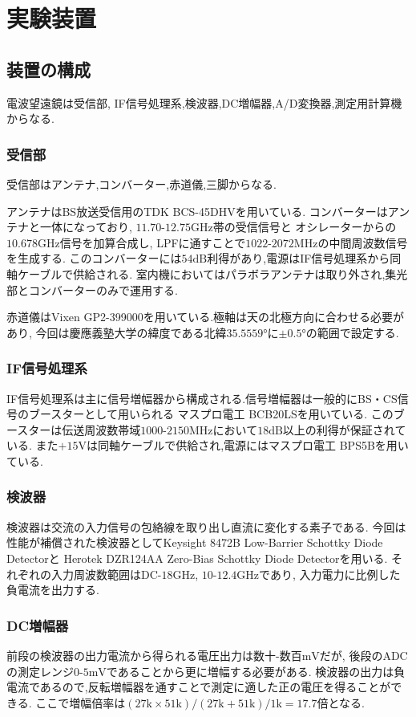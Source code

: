 \section{実験装置}
\subsection{装置の構成}
電波望遠鏡は受信部, IF信号処理系,検波器,DC増幅器,A/D変換器,測定用計算機からなる.
\subsubsection{受信部}
受信部はアンテナ,コンバーター,赤道儀,三脚からなる.

アンテナはBS放送受信用のTDK BCS-45DHVを用いている.
コンバーターはアンテナと一体になっており, $11.70$-$12.75\si{\giga\hertz}$帯の受信信号と
オシレーターからの$10.678\si{\giga\hertz}$信号を加算合成し,
LPFに通すことで$1022$-$2072\si{\mega\hertz}$の中間周波数信号を生成する.
このコンバーターには$54\si{\deci\bel}$利得があり,電源はIF信号処理系から同軸ケーブルで供給される.
室内機においてはパラボラアンテナは取り外され,集光部とコンバーターのみで運用する.

赤道儀はVixen GP2-399000を用いている.極軸は天の北極方向に合わせる必要があり,
今回は慶應義塾大学の緯度である北緯$35.5559\si{\degree}$に$\pm0.5\si{\degree}$の範囲で設定する.
\subsubsection{IF信号処理系}
IF信号処理系は主に信号増幅器から構成される.信号増幅器は一般的にBS・CS信号のブースターとして用いられる
マスプロ電工 BCB20LSを用いている.
このブースターは伝送周波数帯域$1000$-$2150\si{\mega\hertz}$において$18\si{\deci\bel}$以上の利得が保証されている.
また$+15\si{\volt}$は同軸ケーブルで供給され,電源にはマスプロ電工 BPS5Bを用いている.
\subsubsection{検波器}
検波器は交流の入力信号の包絡線を取り出し直流に変化する素子である.
今回は性能が補償された検波器としてKeysight 8472B Low-Barrier Schottky Diode Detectorと
Herotek DZR124AA Zero-Bias Schottky Diode Detectorを用いる.
それぞれの入力周波数範囲はDC-$18\si{\giga\hertz}$, $10$-$12.4\si{\giga\hertz}$であり,
入力電力に比例した負電流を出力する.
\subsubsection{DC増幅器}
前段の検波器の出力電流から得られる電圧出力は数十-数百$\si{\milli\volt}$だが,
後段のADCの測定レンジ$0$-$5\si{\milli\volt}$であることから更に増幅する必要がある.
検波器の出力は負電流であるので,反転増幅器を通すことで測定に適した正の電圧を得ることができる.
ここで増幅倍率は$(27\si{\kilo}\times51\si{\kilo})/(27\si{\kilo}+51\si{\kilo})/1\si{\kilo}=17.7$倍となる.
